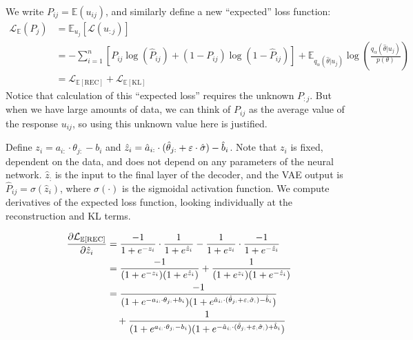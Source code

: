 We write $P_{ij} = \mathbb{E}(u_{ij})$, and similarly define a new ``expected'' loss function:
\begin{equation}
  \begin{split}
  \mathcal{L}_\mathbb{E}(P_j) &= \mathbb{E}_{u_j}[\mathcal{L}(u_{:j})] \\
  &= -\sum_{i=1}^n [P_{ij} \log(\hat P_{ij}) + (1-P_{ij})\log(1 - \hat P_{ij})] + \mathbb{E}_{q_\alpha(\hat \theta | u_j)}\log\left( \frac{q_{\alpha}(\hat \theta |u_j)}{p(\theta)}\right) \\
    &= \mathcal{L}_{\mathbb{E}[\text{REC}]} + \mathcal{L}_{\mathbb{E}[\text{KL}]}
  \end{split}
  \label{eq:expected_loss}
\end{equation}
Notice that calculation of this ``expected loss'' requires the unknown $P_{:j}$. But when we have large amounts of data, we can think of $P_{ij}$ as the average value of the response $u_{ij}$, so using this unknown value here is justified.

Define $z_i = a_{i:} \cdot \theta_{j:} - b_i$ and $\hat z_i = \hat a_{i:} \cdot (\hat \theta_{j:} + \varepsilon \cdot \hat \sigma) - \hat b_i$. Note that $z_i$ is fixed, dependent on the data, and does not depend on any parameters of the neural network. $\hat z_:$ is the input to the final layer of the decoder, and the VAE output is $\hat P_{ij} = \sigma(\hat z_i)$, where $\sigma(\cdot)$ is the sigmoidal activation function. We compute derivatives of the expected loss function, looking individually at the reconstruction and KL terms. 

\begin{equation}
  \begin{split}
  \frac{\partial \mathcal{L}_{\mathbb{E}[\text{REC}]}}{\partial \hat z_i} &= \frac{-1}{1 + e^{-z_i}}\cdot \frac{1}{1 + e^{\hat z_i}} - \frac{1}{1 + e^{z_i}}\cdot \frac{-1}{1 + e^{-\hat z_i}} \\
  &= \frac{-1}{(1 + e^{-z_i})(1 + e^{\hat z_i})} + \frac{1}{(1 + e^{z_i})(1 + e^{-\hat z_i})} \\
  &= \frac{-1}{(1 + e^{-a_{i:} \cdot \theta_{j:} + b_i})(1 + e^{\hat a_{i:} \cdot (\hat \theta_{j:} + \varepsilon_: \hat \sigma_:) - \hat b_i})} \\
  &\quad + \frac{1}{(1 + e^{a_{i:} \cdot \theta_{j:} - b_i})(1 + e^{-\hat a_{i:} \cdot (\hat \theta_{j:} + \varepsilon_: \hat \sigma_:) + \hat b_i})} 
\end{split}
  \label{eq:z_deriv}
\end{equation}


